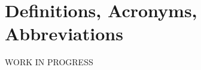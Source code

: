\documentclass[../../DD.tex]{subfiles}
\begin{document}
\section{Definitions, Acronyms, Abbreviations}
	WORK IN PROGRESS
	
\end{document}

